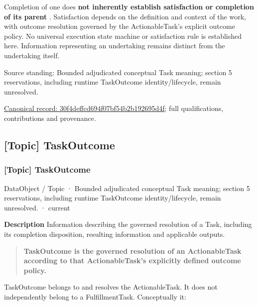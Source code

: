 Completion of one \texttt{} does \textbf{not inherently establish
satisfaction or completion of its parent \texttt{}}. Satisfaction
depends on the definition and context of the work, with outcome resolution
governed by the ActionableTask's explicit outcome policy. No universal
execution state machine or satisfaction rule is established here. Information
representing an undertaking remains distinct from the undertaking itself.



Source standing: Bounded adjudicated conceptual Task meaning; section 5 reservations, including runtime TaskOutcome identity/lifecycle, remain unresolved.


{\footnotesize \href{../../../../continuum/application/data-object/topic/30f4deffcd694f07bf54b2b192695d4f.md}{Canonical record: 30f4deffcd694f07bf54b2b192695d4f}; full qualifications, contributions and provenance.}\par
\subsection{[Topic] TaskOutcome}

\subsubsection{[Topic] TaskOutcome}

\label{element:08d8ee19a30f418f9d5bc497ced0d1ef}
{\small DataObject / Topic · Bounded adjudicated conceptual Task meaning; section 5 reservations, including runtime TaskOutcome identity/lifecycle, remain unresolved. · current}\par

\textbf{Description}
Information describing the governed resolution of a Task, including its completion disposition, resulting information and applicable outputs.



\begin{quote}


\textbf{TaskOutcome is the governed resolution of an ActionableTask according to
that ActionableTask's explicitly defined outcome policy.}



\end{quote}


TaskOutcome belongs to and resolves the ActionableTask. It does not
independently belong to a FulfillmentTask. Conceptually it:



